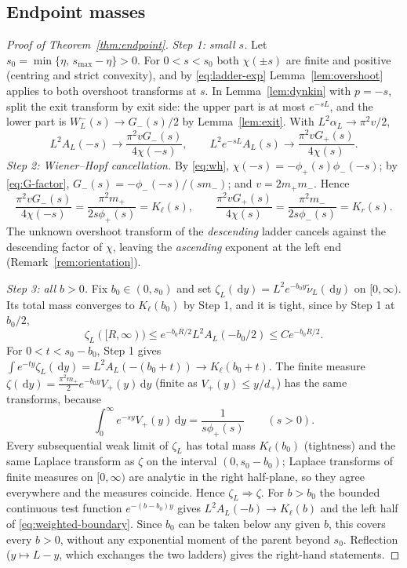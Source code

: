 \documentclass[11pt,a4paper]{article}
\theoremstyle{definition}
\theoremstyle{remark}
\newcommand{\1}{\mathbf 1}
\newcommand{\dd}{\,\mathrm d}
\newcommand{\Kl}{K_{\ell}}
\newcommand{\Kr}{K_{r}}
\begin{document}
\subsection{Endpoint masses}
\begin{proof}[Proof of Theorem~\ref{thm:endpoint}]
\emph{Step 1: small $s$.} Let $s_0=\min\{\eta,\,s_{\max}-\eta\}>0$. For $0<s<s_0$ both $\chi(\pm s)$ are finite and positive (centring and strict convexity), and by \eqref{eq:ladder-exp} Lemma~\ref{lem:overshoot} applies to both overshoot transforms at $s$. In Lemma~\ref{lem:dynkin} with $p=-s$, split the exit transform by exit side: the upper part is at most $e^{-sL}$, and the lower part is $W_L^-(s)\to G_-(s)/2$ by Lemma~\ref{lem:exit}. With $L^2\alpha_L\to\pi^2v/2$,
\begin{equation}\label{eq:small-laplace}
 L^2A_L(-s)\to\frac{\pi^2vG_-(s)}{4\chi(-s)},\qquad L^2e^{-sL}A_L(s)\to\frac{\pi^2vG_+(s)}{4\chi(s)}.
\end{equation}
\emph{Step 2: Wiener--Hopf cancellation.} By \eqref{eq:wh}, $\chi(-s)=-\phi_+(s)\phi_-(-s)$; by \eqref{eq:G-factor}, $G_-(s)=-\phi_-(-s)/(sm_-)$; and $v=2m_+m_-$. Hence
\begin{equation}\label{eq:cancellation}
 \frac{\pi^2vG_-(s)}{4\chi(-s)}=\frac{\pi^2m_+}{2s\phi_+(s)}=\Kl(s),\qquad \frac{\pi^2vG_+(s)}{4\chi(s)}=\frac{\pi^2m_-}{2s\phi_-(s)}=\Kr(s).
\end{equation}
The unknown overshoot transform of the \emph{descending} ladder cancels against the descending factor of $\chi$, leaving the \emph{ascending} exponent at the left end (Remark~\ref{rem:orientation}).

\emph{Step 3: all $b>0$.} Fix $b_0\in(0,s_0)$ and set $\zeta_L(\dd y)=L^2e^{-b_0y}\widetilde\nu_L(\dd y)$ on $[0,\infty)$. Its total mass converges to $\Kl(b_0)$ by Step 1, and it is tight, since by Step 1 at $b_0/2$,
\[
 \zeta_L([R,\infty))\le e^{-b_0R/2}L^2A_L(-b_0/2)\le Ce^{-b_0R/2}.
\]
For $0<t<s_0-b_0$, Step 1 gives $\int e^{-ty}\zeta_L(\dd y)=L^2A_L(-(b_0+t))\to\Kl(b_0+t)$. The finite measure $\zeta(\dd y)=\frac{\pi^2m_+}{2}e^{-b_0y}V_+(y)\dd y$ (finite as $V_+(y)\le y/d_+$) has the same transforms, because
\begin{equation}\label{eq:renewal-laplace}
 \int_0^\infty e^{-sy}V_+(y)\dd y=\frac1{s\phi_+(s)}\qquad(s>0).
\end{equation}
Every subsequential weak limit of $\zeta_L$ has total mass $\Kl(b_0)$ (tightness) and the same Laplace transform as $\zeta$ on the interval $(0,s_0-b_0)$; Laplace transforms of finite measures on $[0,\infty)$ are analytic in the right half-plane, so they agree everywhere and the measures coincide. Hence $\zeta_L\Rightarrow\zeta$. For $b>b_0$ the bounded continuous test function $e^{-(b-b_0)y}$ gives $L^2A_L(-b)\to\Kl(b)$ and the left half of \eqref{eq:weighted-boundary}. Since $b_0$ can be taken below any given $b$, this covers every $b>0$, without any exponential moment of the parent beyond $s_0$. Reflection ($y\mapsto L-y$, which exchanges the two ladders) gives the right-hand statements.
\end{proof}
\end{document}
